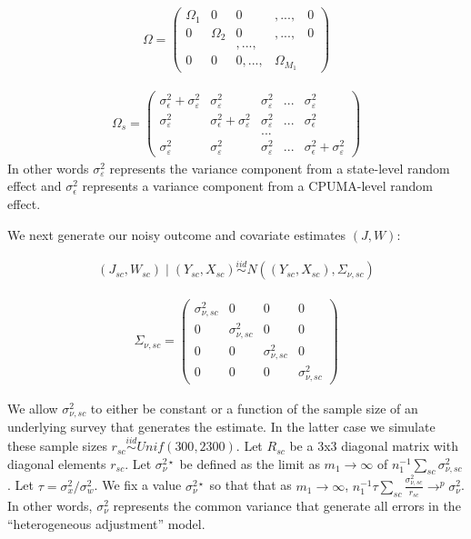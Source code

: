 \begin{align*}
    \Omega = \begin{pmatrix}
    \Omega_1 & 0 & 0 &, ... ,& 0 \\
    0 & \Omega_2 & 0 & , ..., & 0 \\
    & & , ..., & & \\
    0 & 0 & 0, ..., & \Omega_{M_1} 
    \end{pmatrix}
\end{align*}

\begin{align*}
    \Omega_s = \begin{pmatrix}
    \sigma^2_{\epsilon} + \sigma^2_{\varepsilon} & \sigma^2_{\varepsilon} & \sigma^2_{\varepsilon} & ... & \sigma^2_{\varepsilon} \\
    \sigma^2_{\varepsilon} & \sigma^2_{\epsilon} + \sigma^2_{\varepsilon} & \sigma^2_{\varepsilon}& ... & \sigma^2_{\epsilon} \\
    & & ... & & \\
    \sigma^2_{\varepsilon} & \sigma^2_{\varepsilon} & \sigma^2_{\varepsilon} & ... & \sigma^2_{\epsilon} + \sigma^2_{\varepsilon}
    \end{pmatrix}
\end{align*}
%
In other words $\sigma^2_{\varepsilon}$ represents the variance component from a state-level random effect and $\sigma^2_{\epsilon}$ represents a variance component from a CPUMA-level random effect.

We next generate our noisy outcome and covariate estimates $(J, W)$:

\begin{align*}
(J_{sc}, W_{sc}) \mid (Y_{sc}, X_{sc}) \stackrel{iid}\sim N((Y_{sc}, X_{sc}), \Sigma_{\nu, sc})
\end{align*}

\begin{align*}
    \Sigma_{\nu, sc} = \begin{pmatrix}
    \sigma^2_{\nu, sc} & 0 & 0 & 0 \\
    0 & \sigma^2_{\nu, sc} & 0 & 0 \\
    0 & 0 & \sigma^2_{\nu, sc} & 0 \\
    0 & 0 & 0 & \sigma^2_{\nu, sc}
    \end{pmatrix}
\end{align*}

We allow $\sigma^2_{\nu, sc}$ to either be constant or a function of the sample size of an underlying survey that generates the estimate. In the latter case we simulate these sample sizes $r_{sc} \stackrel{iid}\sim Unif(300, 2300)$. Let $R_{sc}$ be a 3x3 diagonal matrix with diagonal elements $r_{sc}$. Let $\sigma_{\nu}^{2\star}$ be defined as the limit as $m_1 \to \infty$ of $n_1^{-1}\sum_{sc}\sigma^2_{\nu, sc}$. Let $\tau = \sigma^2_x/\sigma^2_w$. We fix a value $\sigma_{\nu}^{2\star}$ so that that as $m_1 \to \infty$, $n_1^{-1} \tau \sum_{sc}\frac{\sigma^2_{\nu, sc}}{r_{sc}} \to^p \sigma^2_{\nu}$. In other words, $\sigma_{\nu}^2$ represents the common variance that generate all errors in the ``heterogeneous adjustment'' model. 


